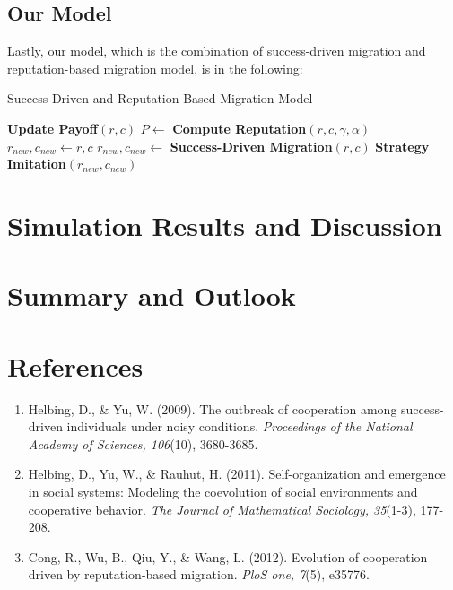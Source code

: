 \documentclass[11pt]{article}
\begin{document}
\subsection{Our Model}
Lastly, our model, which is the combination of success-driven migration and reputation-based migration model, is in the following:

\begin{algorithm}[!htbp]
  \caption{Success-Driven and Reputation-Based Migration Model}\label{ourmodel}
	\begin{algorithmic}[1]
			
			\State \textbf{Update Payoff$(r,c)$}
			\State $P \gets$ \textbf{Compute Reputation$(r,c,\gamma,\alpha)$}
			\State $r_{new},c_{new} \gets r,c$
				
				\State $r_{new},c_{new} \gets$ \textbf{Success-Driven Migration$(r,c)$}
			\EndIf
			\State \textbf{Strategy Imitation$(r_{new},c_{new})$}
		\EndFor      
		\EndFor      
    \EndProcedure
	\end{algorithmic}
\end{algorithm}

\section{Simulation Results and Discussion}

\section{Summary and Outlook}

\section{References}

\begin{enumerate}
\item Helbing, D., \& Yu, W. (2009). The outbreak of cooperation among success-driven individuals under noisy conditions. \textit{Proceedings of the National Academy of Sciences, 106}(10), 3680-3685.
\item Helbing, D., Yu, W., \& Rauhut, H. (2011). Self-organization and emergence in social systems: Modeling the coevolution of social environments and cooperative behavior. \textit{The Journal of Mathematical Sociology, 35}(1-3), 177-208.
\item Cong, R., Wu, B., Qiu, Y., \& Wang, L. (2012). Evolution of cooperation driven by reputation-based migration. \textit{PloS one, 7}(5), e35776.
\end{enumerate}
\end{document}
